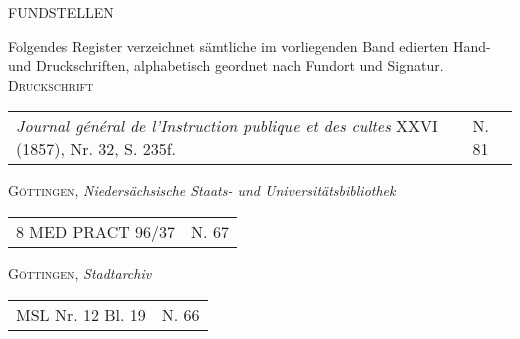 \thispagestyle{empty}
\vspace{3.0ex}
\begin{center}\uppercase{\normalsize Fundstellen}\end{center}
\footnotesize
Folgendes Register verzeichnet sämtliche im vorliegenden Band edierten Hand- und Druckschriften, 
alpha\-betisch geordnet nach \mbox{Fund\-ort} und Signatur.\\[4.0ex]%
\textsc{Druckschrift}\\
\vspace{-3mm}
\setlength{\columnseprule}{0.4pt}
\renewcommand*{\chapter}{\OrigChapter}
\setlength\LTleft{\fill} \setlength\LTright{\fill}
\begin{longtable}{ll}
\footnotesize
\textit{Journal général de l'Instruction publique et des cultes} XXVI (1857), Nr. 32, S. 235f. & N. 81\\%
\end{longtable}
\vspace{3.0ex}
\noindent
\textsc{Göttingen}, \textit{Niedersächsische Staats- und Universitätsbibliothek}\\ 
\vspace{-3mm}
\setlength{\columnseprule}{0.4pt}
\renewcommand*{\chapter}{\OrigChapter}
\setlength\LTleft{\fill} \setlength\LTright{\fill}
\begin{longtable}{ll}
\footnotesize
8 MED PRACT 96/37 & N. 67\\%
\end{longtable}
\vspace{3.0ex}
\noindent
\textsc{Göttingen}, \textit{Stadtarchiv}\\ 
\vspace{-3mm}
\setlength{\columnseprule}{0.4pt}
\renewcommand*{\chapter}{\OrigChapter}
\setlength\LTleft{\fill} \setlength\LTright{\fill}
\begin{longtable}{ll}
\footnotesize
MSL Nr. 12 Bl. 19 & N. 66\\%
\end{longtable}
